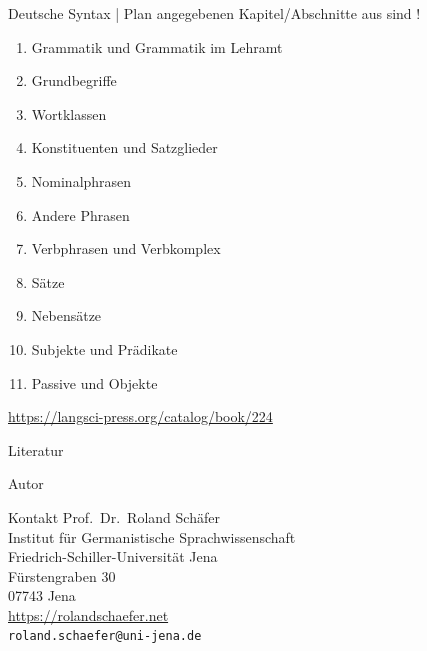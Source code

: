 \documentclass[handout,aspectratio=1610,dvipsnames]{beamer}
\begin{document}
  \begin{frame}
    {Deutsche Syntax | Plan}
     angegebenen Kapitel\slash Abschnitte aus  sind !\\
    \Halbzeile
    \begin{enumerate}
      \item Grammatik und Grammatik im Lehramt 
      \item Grundbegriffe 
      \item Wortklassen 
      \item Konstituenten und Satzglieder 
      \item Nominalphrasen 
      \item Andere Phrasen 
      \item Verbphrasen und Verbkomplex 
      \item Sätze  
      \item Nebensätze 
      \item Subjekte und Prädikate 
      \item Passive und Objekte 
    \end{enumerate}
    \Halbzeile
    \centering 
    \url{https://langsci-press.org/catalog/book/224}
  \end{frame}
\fi


\makeatletter
\setcounter{lastpagemainpart}{\the\c@framenumber}
\makeatother

\appendix

\begin{frame}[allowframebreaks]
  {Literatur}
  \renewcommand*{\bibfont}{\footnotesize}
  \printbibliography
\end{frame}

\begin{frame}
  {Autor}
  \begin{block}{Kontakt}
    Prof.\ Dr.\ Roland Schäfer\\
    Institut für Germanistische Sprachwissenschaft\\
    Friedrich-Schiller-Universität Jena\\
    Fürstengraben 30\\
    07743 Jena\\[\baselineskip]
    \url{https://rolandschaefer.net}\\
    \texttt{roland.schaefer@uni-jena.de}
  \end{block}
\end{frame}
\end{document}
